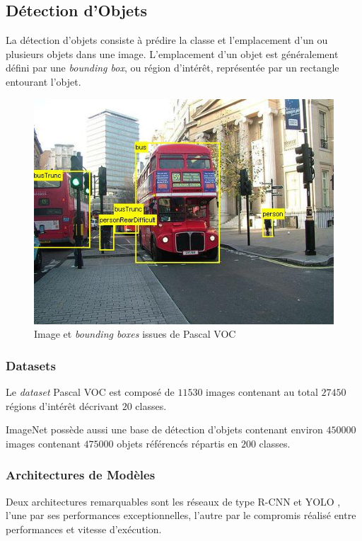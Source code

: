 \documentclass[a4paper, 11pt]{report}
\begin{document}
\subsection{Détection d'Objets}
La détection d'objets consiste à prédire la classe et l'emplacement d'un ou plusieurs objets dans une image. L'emplacement d'un objet est généralement défini par une \emph{bounding box}, ou région d'intérêt, représentée par un rectangle entourant l'objet.
\begin{figure}[H]
	\centering
	\includegraphics[scale=0.40625]{Images/Pascal_VOC_Detection.jpg}
	\caption{Image et \emph{bounding boxes} issues de Pascal VOC}
\end{figure}

\subsubsection{Datasets}
Le \emph{dataset} Pascal VOC \citep{Everingham2010} est composé de $11530$ images contenant au total $27450$ régions d'intérêt décrivant $20$ classes.

ImageNet \citep{Krizhevsky2012a} possède aussi une base de détection d'objets contenant environ $450000$ images contenant $475000$ objets référencés répartis en $200$ classes.
\subsubsection{Architectures de Modèles}
Deux architectures remarquables sont les réseaux de type R-CNN \citep{Girshick2013} et YOLO \citep{Redmon2015}, l'une par ses performances exceptionnelles, l'autre par le compromis réalisé entre performances et vitesse d’exécution.
\end{document}
